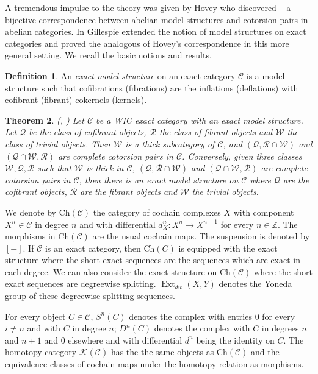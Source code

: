 \documentclass[11pt,a4paper,reqno]{amsart}
\newcommand{\bbZ}{\mathbb{Z}}
\newcommand{\Ext}{\operatorname{Ext}}
\newcommand{\C}{\mathcal{C}}
\newcommand{\K}{\mathcal{K}}
\newcommand{\clQ}{\mathcal{Q}}
\newcommand{\R}{\mathcal{R}}
\newcommand{\W}{\mathcal{W}}
\newcommand{\Ch}{\mathrm{Ch}}
\theoremstyle{plain}
\newtheorem{thm}{Theorem}[section]
\theoremstyle{definition}
\newtheorem{defn}[thm]{Definition}
\theoremstyle{remark}
\begin{document}
A tremendous impulse to the theory was given by  Hovey who discovered ~\cite{Hov07} a bijective correspondence between abelian model structures and cotorsion pairs in abelian categories.
%
In \cite{G5} Gillespie extended the notion of model structures on exact categories and proved the analogous of Hovey's correspondence in this more general setting.
 We recall the basic notions and results.
  \begin{defn}\label{D:exact-model} An \emph{exact model structure} on an exact category $\C$ is a model structure such that cofibrations (fibrations) are the inflations (deflations) with cofibrant (fibrant) cokernels (kernels).
\end{defn}
%
\begin{thm}\label{T:correspondence} (\cite{Hov07}, \cite{G5}) Let $\C$ be a WIC exact category with an exact model structure. Let $\clQ$ be the class of cofibrant objects, $\R$ the class of fibrant objects and $\W$ the class of trivial objects. Then $\W$ is a thick subcategory of $\C$, and $(\clQ, \R\cap \W)$ and $(\clQ\cap\W, \R)$ are complete cotorsion pairs in $\C$.
Conversely, given three classes $\W, \clQ, \R$ such that $\W$ is thick in $\C$, $(\clQ, \R\cap \W)$ and $(\clQ\cap\W, \R)$ are complete cotorsion pairs in $\C$, then there is an exact model structure on $\C$ where $\clQ$ are the cofibrant objects, $\R$ are the fibrant objects and $\W$ the trivial objects.
\end{thm}

We denote by $\Ch(\C)$ the category of cochain complexes $X$ with component $X^n\in \C$ in degree $n$ and with differential $d^n_X\colon X^n\to X^{n+1}$ for every $n\in \bbZ$. The morphisms in $\Ch(\C)$ are the usual cochain maps. The suspension is denoted by $[-]$.
 If $\C$ is an exact category, then $\Ch(C)$ is equipped with the exact structure where the short exact sequences are the sequences which are exact in each degree. We can also consider the exact structure on $\Ch(\C)$ where the short exact sequences are degreewise splitting. $\Ext_{dw}(X, Y)$ denotes the Yoneda group of these degreewise splitting sequences.

 For every object $C\in \C$, $S^n(C)$ denotes the complex with entries $0$ for every $i\neq n$ and with $C$ in degree $n$; $D^n(C)$ denotes the complex with $C$ in degrees $n$ and $n+1$ and $0$ elsewhere and with differential $d^n$ being the identity on $C$. The homotopy category $\K(\C)$ has the the same objects as $\Ch(\C)$ and the equivalence classes of cochain maps under the homotopy relation as morphisms.
\end{document}
